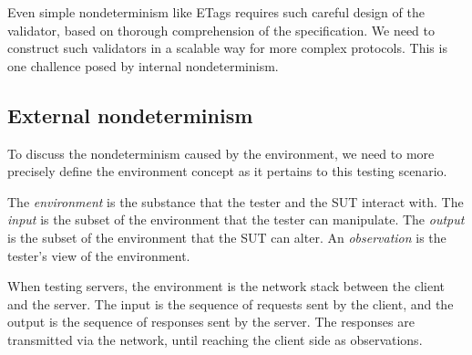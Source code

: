 Even simple nondeterminism like ETags requires such careful design of the
validator, based on thorough comprehension of the specification.  We need to
construct such validators in a scalable way for more complex protocols.  This is
one challence posed by internal nondeterminism.

\subsection{External nondeterminism}
\label{sec:intro-external-nondet}
To discuss the nondeterminism caused by the environment, we need to more
precisely define the environment concept as it pertains to this testing
scenario.
\begin{definition}
\label{def:environment}
  The {\em environment} is the substance that the tester and the SUT interact
  with.  The {\em input} is the subset of the environment that the tester can
  manipulate.  The {\em output} is the subset of the environment that the SUT
  can alter.  An {\em observation} is the tester's view of the environment.
\end{definition}
When testing servers, the environment is the network stack between the client
and the server.  The input is the sequence of requests sent by the client, and
the output is the sequence of responses sent by the server.  The responses are
transmitted via the network, until reaching the client side as observations.

